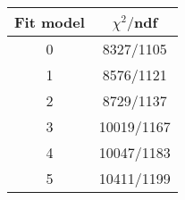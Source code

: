 \begin{tabular}{c|c}
Fit model & $\chi^2/$ndf \\
\hline
0 & 8327/1105\\
1 & 8576/1121\\
2 & 8729/1137\\
3 & 10019/1167\\
4 & 10047/1183\\
5 & 10411/1199\\
\end{tabular}
